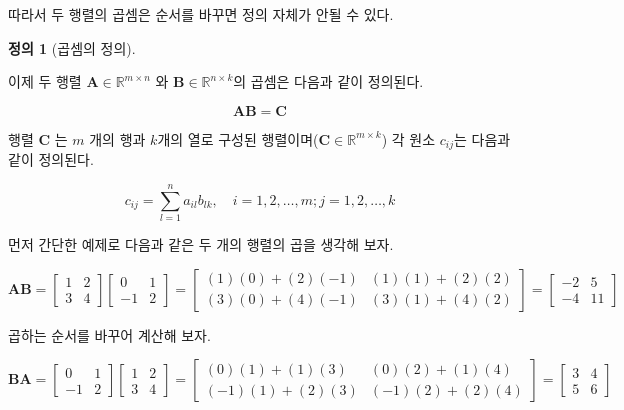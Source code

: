 \documentclass[
  11pt,
  a4paper,
  oneside]{scrbook}
\newcommand{\RR}{\mathbb{R}}
\theoremstyle{definition}
\newtheorem{definition}{정의}[chapter]
\theoremstyle{definition}
\theoremstyle{plain}
\theoremstyle{remark}
\begin{document}
따라서 두 행렬의 곱셈은 순서를 바꾸면 정의 자체가 안될 수 있다.

\begin{definition}[곱셈의
정의]\protect\hypertarget{def-matrix-product}{}\label{def-matrix-product}

이제 두 행렬 \(\pmb A \in \RR^{m \times n}\) 와
\(\pmb B \in \RR^{n \times k}\)의 곱셈은 다음과 같이 정의된다.

\[ \pmb A \pmb B =  \pmb C\]

행렬 \(\pmb C\) 는 \(m\) 개의 행과 \(k\)개의 열로 구성된
행렬이며(\(\pmb C \in \RR^{m \times k}\)) 각 원소 \(c_{ij}\)는 다음과
같이 정의된다.

\[  c_{ij} = \sum_{l=1}^n a_{il} b_{lk}, \quad i=1,2,\dots,m; j=1,2,\dots,k \]

\end{definition}

먼저 간단한 예제로 다음과 같은 두 개의 행렬의 곱을 생각해 보자.

\[
\pmb A \pmb B =
\begin{bmatrix}
1 & 2 \\
3 & 4 
\end{bmatrix}
\begin{bmatrix}
0 & 1 \\
-1 & 2
\end{bmatrix}
=
\begin{bmatrix}
(1)(0) + (2)(-1) & (1)(1) + (2)(2) \\
(3)(0) + (4)(-1) & (3)(1) + (4)(2)
\end{bmatrix}
=
\begin{bmatrix}
-2 & 5 \\
-4 & 11
\end{bmatrix}
\]

곱하는 순서를 바꾸어 계산해 보자.

\[
\pmb B \pmb A =
\begin{bmatrix}
0 & 1 \\
-1 & 2
\end{bmatrix}
\begin{bmatrix}
1 & 2 \\
3 & 4 
\end{bmatrix}
=
\begin{bmatrix}
(0)(1) + (1)(3) & (0)(2) + (1)(4) \\
(-1)(1) + (2)(3) & (-1)(2) + (2)(4)
\end{bmatrix}
=
\begin{bmatrix}
3 & 4 \\
5 & 6
\end{bmatrix}
\]
\end{document}
